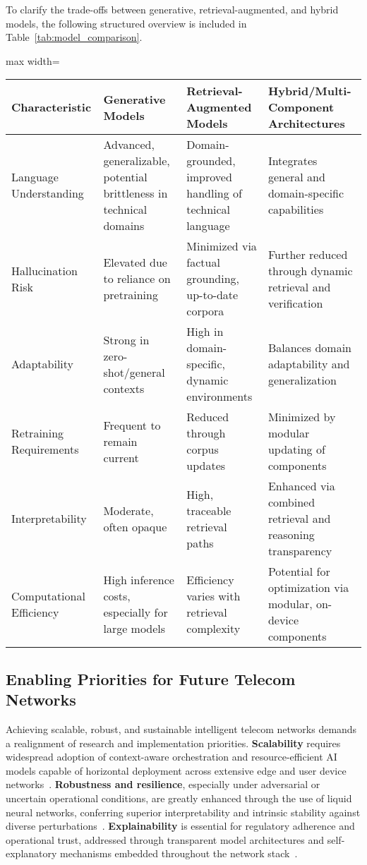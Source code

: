 \documentclass[sigconf]{acmart}
\begin{document}
To clarify the trade-offs between generative, retrieval-augmented, and hybrid models, the following structured overview is included in Table~\ref{tab:model_comparison}.

\begin{table*}[htbp]
\centering
\caption{Comparative analysis of AI model paradigms for telecom applications}
\label{tab:model_comparison}
\begin{adjustbox}{max width=\textwidth}
\begin{tabular}{@{}llll@{}}
\toprule
\textbf{Characteristic} & \textbf{Generative Models} & \textbf{Retrieval-Augmented Models} & \textbf{Hybrid/Multi-Component Architectures} \\
\midrule
Language Understanding & Advanced, generalizable, potential brittleness in technical domains & Domain-grounded, improved handling of technical language & Integrates general and domain-specific capabilities \\
Hallucination Risk & Elevated due to reliance on pretraining & Minimized via factual grounding, up-to-date corpora & Further reduced through dynamic retrieval and verification \\
Adaptability & Strong in zero-shot/general contexts & High in domain-specific, dynamic environments & Balances domain adaptability and generalization \\
Retraining Requirements & Frequent to remain current & Reduced through corpus updates & Minimized by modular updating of components \\
Interpretability & Moderate, often opaque & High, traceable retrieval paths & Enhanced via combined retrieval and reasoning transparency \\
Computational Efficiency & High inference costs, especially for large models & Efficiency varies with retrieval complexity & Potential for optimization via modular, on-device components \\
\bottomrule
\end{tabular}
\end{adjustbox}
\end{table*}

\subsection{Enabling Priorities for Future Telecom Networks}

Achieving scalable, robust, and sustainable intelligent telecom networks demands a realignment of research and implementation priorities. \textbf{Scalability} requires widespread adoption of context-aware orchestration and resource-efficient AI models capable of horizontal deployment across extensive edge and user device networks~\cite{ref15,ref17,ref19}. \textbf{Robustness and resilience}, especially under adversarial or uncertain operational conditions, are greatly enhanced through the use of liquid neural networks, conferring superior interpretability and intrinsic stability against diverse perturbations~\cite{ref19}. \textbf{Explainability} is essential for regulatory adherence and operational trust, addressed through transparent model architectures and self-explanatory mechanisms embedded throughout the network stack~\cite{ref19,ref21,ref22,ref23}.
\end{document}
